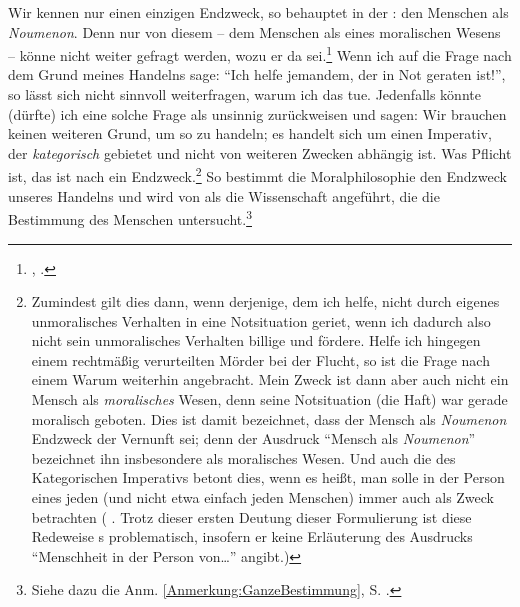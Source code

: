 Wir kennen nur einen einzigen Endzweck, so behauptet
 in der : den Menschen als
\emph{Noumenon}. Denn nur von diesem -- dem Menschen als eines moralischen
Wesens -- könne nicht weiter gefragt werden, wozu er da
sei.\footnote{\cite[Vgl.][\S~84]{Kant:KritikderUrteilskraft2009}, \cite[V:
435.15--436.2]{Kant:GesammelteWerke1900ff.}.} Wenn ich auf die Frage nach dem
Grund meines Handelns sage: \enquote{Ich helfe jemandem, der in Not geraten
ist!}, so lässt sich nicht sinnvoll weiterfragen, warum ich das tue.
Jedenfalls könnte (dürfte) ich eine solche Frage als unsinnig zurückweisen und
sagen: Wir brauchen keinen weiteren Grund, um so zu handeln; es handelt sich um
einen Imperativ, der \emph{kategorisch} gebietet und nicht von weiteren Zwecken
abhängig ist. Was Pflicht ist, das ist nach  ein
Endzweck.\footnote{Zumindest gilt dies dann, wenn derjenige, dem ich helfe,
nicht durch eigenes unmoralisches Verhalten in eine Notsituation geriet, wenn ich dadurch also nicht
sein unmoralisches Verhalten billige und fördere. Helfe ich hingegen einem
rechtmäßig verurteilten Mörder bei der Flucht, so ist die Frage nach einem Warum
weiterhin angebracht. Mein Zweck ist dann aber auch nicht ein Mensch als
\emph{moralisches} Wesen, denn seine Notsituation (die Haft) war gerade
moralisch geboten. Dies ist damit bezeichnet, dass der Mensch als
\emph{Noumenon} Endzweck der Vernunft sei; denn der Ausdruck \enquote{Mensch
als \emph{Noumenon}} bezeichnet ihn insbesondere als moralisches Wesen.
Und auch die  des Kategorischen Imperativs betont dies, wenn
es heißt, man solle  in der Person eines jeden (und
nicht etwa einfach jeden Menschen) immer auch als Zweck betrachten
\mkbibparens{\cite[vgl.][BA
66\,f.,]{Kant:GrundlegungzurMetaphysikderSitten1965} \cite[][IV: 429.10--12]{Kant:GesammelteWerke1900ff.}. Trotz dieser ersten
Deutung dieser Formulierung ist diese Redeweise s
problematisch, insofern er keine Erläuterung des Ausdrucks \enquote{Menschheit
in der Person von\dots} angibt.}} So bestimmt
die Moralphilosophie den Endzweck unseres Handelns und wird von
 als die Wissenschaft angeführt, die die Bestimmung des
Menschen untersucht.\footnote{Siehe dazu die Anm.
\ref{Anmerkung:GanzeBestimmung}, S.
\pageref{Anmerkung:GanzeBestimmung}.}

